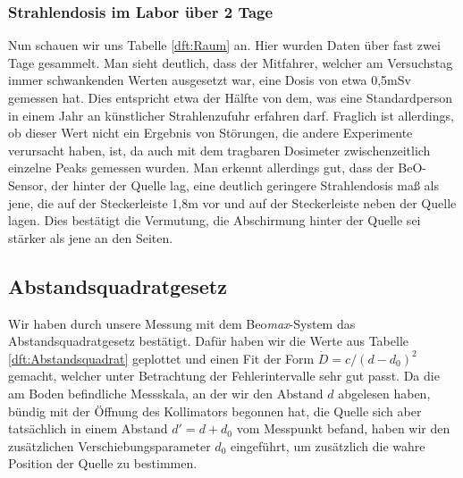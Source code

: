 \subsubsection{Strahlendosis im Labor über 2 Tage}
Nun schauen wir uns Tabelle \ref{dft:Raum} an. Hier wurden Daten über fast zwei Tage gesammelt. Man sieht 
deutlich, dass der Mitfahrer, welcher am Versuchstag immer schwankenden Werten ausgesetzt war, eine Dosis von 
etwa 0,5mSv gemessen hat. Dies entspricht etwa der Hälfte von dem, was eine Standardperson in einem Jahr an 
künstlicher Strahlenzufuhr erfahren darf. Fraglich ist allerdings, ob dieser Wert nicht ein Ergebnis von Störungen, 
die andere Experimente verursacht haben, ist, da auch mit dem tragbaren Dosimeter zwischenzeitlich einzelne Peaks gemessen wurden.
Man erkennt allerdings gut, dass der BeO-Sensor, der hinter der Quelle lag, eine deutlich geringere Strahlendosis maß als jene, die auf der Steckerleiste 1,8m vor und auf der Steckerleiste neben der Quelle lagen. Dies bestätigt die Vermutung, die Abschirmung hinter der Quelle sei stärker als jene an den Seiten.


\subsection{Abstandsquadratgesetz}
Wir haben durch unsere Messung mit dem Beo\textit{max}-System das Abstandsquadratgesetz bestätigt. Dafür haben wir die Werte aus Tabelle \ref{dft:Abstandsquadrat} geplottet und einen Fit der Form $\dot{D} = c/(d-d_0)^2$ gemacht, welcher unter Betrachtung der Fehlerintervalle sehr gut passt. Da die am Boden befindliche Messskala, an der wir den Abstand $d$ abgelesen haben, bündig mit der Öffnung des Kollimators begonnen hat, die Quelle sich aber tatsächlich in einem Abstand $d' = d + d_0$ vom Messpunkt befand, haben wir den zusätzlichen Verschiebungsparameter $d_0$ eingeführt, um zusätzlich die wahre Position der Quelle zu bestimmen.

	\minipanf    
        \label{fig:Abstandsquadrat}
    \minipend
    \vspace{5mm}

